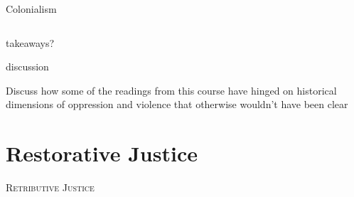 \documentclass[aspectratio=43,17pt]{beamer} %
\begin{document}
\begin{frame}{Colonialism}
\begin{columns}
\begin{column}{0.7\textwidth}
\end{column}
\end{columns}

\end{frame}


\begin{frame}{takeaways?}
    
\centering

\visible<+->{}


\end{frame}



\begin{frame}{discussion}
    
Discuss how some of the readings from this course have hinged on historical dimensions of oppression and violence that otherwise wouldn't have been clear

\end{frame}






\section{Restorative Justice}

\begin{frame}[plain]

\centering 
{\Large\scshape Retributive Justice}



\end{frame}
\end{document}
